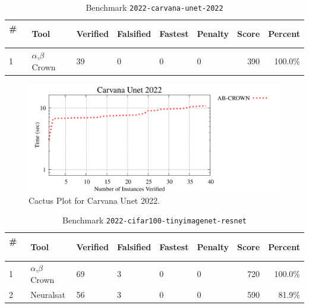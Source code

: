 

\begin{table}[h]
\begin{center}
\caption{Benchmark \texttt{2022-carvana-unet-2022}} \label{tab:cat_{cat}}
{\setlength{\tabcolsep}{2pt}
\begin{tabular}[h]{@{}llllllrr@{}}
\toprule
\textbf{\# ~} & \textbf{Tool} & \textbf{Verified} & \textbf{Falsified} & \textbf{Fastest} & \textbf{Penalty} & \textbf{Score} & \textbf{Percent}\\
\midrule
1 & $\alpha$,$\beta$ Crown & 39 & 0 & 0 & 0 & 390 & 100.0\% \\
\bottomrule
\end{tabular}
}
\end{center}
\end{table}



\begin{figure}[h]
\centerline{\includegraphics[width=\textwidth]{cactus/2022_carvana_unet_2022.pdf}}
\caption{Cactus Plot for Carvana Unet 2022.}
\label{fig:quantPic}
\end{figure}



\begin{table}[h]
\begin{center}
\caption{Benchmark \texttt{2022-cifar100-tinyimagenet-resnet}} \label{tab:cat_{cat}}
{\setlength{\tabcolsep}{2pt}
\begin{tabular}[h]{@{}llllllrr@{}}
\toprule
\textbf{\# ~} & \textbf{Tool} & \textbf{Verified} & \textbf{Falsified} & \textbf{Fastest} & \textbf{Penalty} & \textbf{Score} & \textbf{Percent}\\
\midrule
1 & $\alpha$,$\beta$ Crown & 69 & 3 & 0 & 0 & 720 & 100.0\% \\
2 & Neuralsat & 56 & 3 & 0 & 0 & 590 & 81.9\% \\
\bottomrule
\end{tabular}
}
\end{center}
\end{table}



